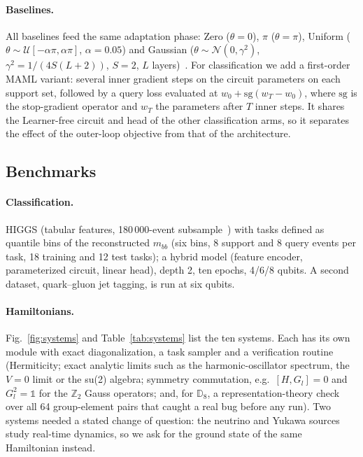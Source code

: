 \documentclass[pdflatex,sn-mathphys-num]{sn-jnl}
\begin{document}
\paragraph{Baselines.} All baselines feed the same adaptation phase: Zero ($\theta=0$), $\pi$ ($\theta=\pi$), Uniform ($\theta\sim\mathcal{U}[-\alpha\pi,\alpha\pi]$, $\alpha=0.05$) and Gaussian ($\theta\sim\mathcal{N}(0,\gamma^2)$, $\gamma^2=1/(4S(L{+}2))$, $S=2$, $L$ layers)~\cite{zhang2022escaping}. For classification we add a first-order MAML variant: several inner gradient steps on the circuit parameters on each support set, followed by a query loss evaluated at $w_0+\mathrm{sg}(w_T-w_0)$, where $\mathrm{sg}$ is the stop-gradient operator and $w_T$ the parameters after $T$ inner steps. It shares the Learner-free circuit and head of the other classification arms, so it separates the effect of the outer-loop objective from that of the architecture.

\subsection{Benchmarks}\label{sec:bench}

\paragraph{Classification.} HIGGS (tabular features, 180\,000-event subsample~\cite{baldi2014higgs}) with tasks defined as quantile bins of the reconstructed $m_{bb}$ (six bins, 8 support and 8 query events per task, 18 training and 12 test tasks); a hybrid model (feature encoder, parameterized circuit, linear head), depth 2, ten epochs, 4/6/8 qubits. A second dataset, quark--gluon jet tagging, is run at six qubits.

\paragraph{Hamiltonians.} Fig.~\ref{fig:systems} and Table~\ref{tab:systems} list the ten systems. Each has its own module with exact diagonalization, a task sampler and a verification routine (Hermiticity; exact analytic limits such as the harmonic-oscillator spectrum, the $V{=}0$ limit or the su(2) algebra; symmetry commutation, e.g.\ $[H,G_l]=0$ and $G_l^2=\mathbb{1}$ for the $\mathbb{Z}_2$ Gauss operators; and, for $\mathbb{D}_8$, a representation-theory check over all 64 group-element pairs that caught a real bug before any run). Two systems needed a stated change of question: the neutrino and Yukawa sources study real-time dynamics, so we ask for the ground state of the same Hamiltonian instead.
\end{document}
